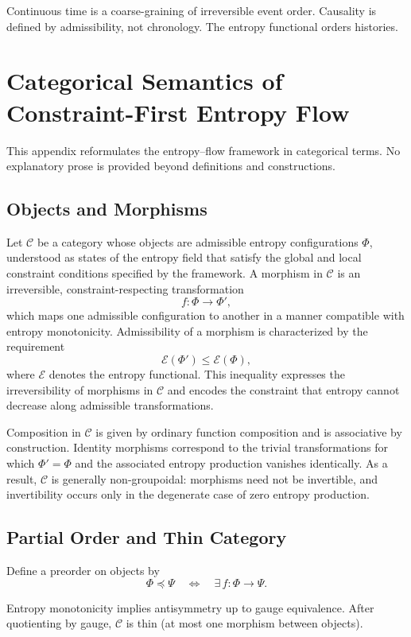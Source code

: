 \documentclass[11pt]{article}
\begin{document}
Continuous time is a coarse-graining of irreversible event order.
Causality is defined by admissibility, not chronology.
The entropy functional orders histories.

\section{Categorical Semantics of Constraint-First Entropy Flow}

This appendix reformulates the entropy–flow framework in categorical terms.
No explanatory prose is provided beyond definitions and constructions.

\subsection*{Objects and Morphisms}

Let $\mathcal{C}$ be a category whose objects are admissible entropy configurations $\Phi$, understood as states of the entropy field that satisfy the global and local constraint conditions specified by the framework. A morphism in $\mathcal{C}$ is an irreversible, constraint-respecting transformation
\[
f : \Phi \to \Phi',
\]
which maps one admissible configuration to another in a manner compatible with entropy monotonicity. Admissibility of a morphism is characterized by the requirement
\[
\mathcal{E}(\Phi') \le \mathcal{E}(\Phi),
\]
where $\mathcal{E}$ denotes the entropy functional. This inequality expresses the irreversibility of morphisms in $\mathcal{C}$ and encodes the constraint that entropy cannot decrease along admissible transformations.

Composition in $\mathcal{C}$ is given by ordinary function composition and is associative by construction. Identity morphisms correspond to the trivial transformations for which $\Phi' = \Phi$ and the associated entropy production vanishes identically. As a result, $\mathcal{C}$ is generally non-groupoidal: morphisms need not be invertible, and invertibility occurs only in the degenerate case of zero entropy production.


\subsection*{Partial Order and Thin Category}

Define a preorder on objects by
\[
\Phi \preceq \Psi
\quad\Longleftrightarrow\quad
\exists\, f : \Phi \to \Psi.
\]

Entropy monotonicity implies antisymmetry up to gauge equivalence.
After quotienting by gauge, $\mathcal{C}$ is thin (at most one morphism between objects).
\end{document}
